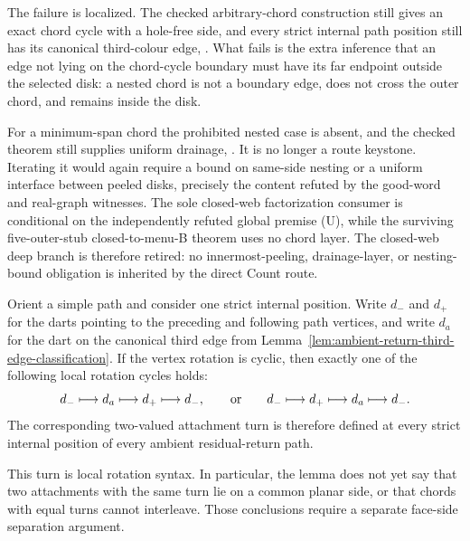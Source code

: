 The failure is localized.  The checked arbitrary-chord construction still
gives an exact chord cycle with a hole-free side,
and every strict internal path position still has its canonical third-colour
edge,
.
What fails is the extra inference that an edge not lying on the chord-cycle
boundary must have its far endpoint outside the selected disk: a nested
chord is not a boundary edge, does not cross the outer chord, and remains
inside the disk.

For a minimum-span chord the prohibited nested case is absent, and the
checked theorem still supplies uniform drainage,
.
It is no longer a route keystone.  Iterating it would again require a bound on
same-side nesting or a uniform interface between peeled disks, precisely the
content refuted by the good-word and real-graph witnesses.  The sole
closed-web factorization consumer is conditional on the independently
refuted global premise (U), while the surviving five-outer-stub
closed-to-menu-B theorem uses no chord layer.  The closed-web deep branch is
therefore retired: no innermost-peeling, drainage-layer, or nesting-bound
obligation is inherited by the direct Count route.

\begin{lemma}
\label{lem:cubic-path-attachment-rotation-side}
Orient a simple path and consider one strict internal position.  Write
$d_-$ and $d_+$ for the darts pointing to the preceding and following path
vertices, and write $d_a$ for the dart on the canonical third edge from
Lemma~\ref{lem:ambient-return-third-edge-classification}.  If the vertex
rotation is cyclic, then exactly one of the following local rotation cycles
holds:
\[
       d_-\longmapsto d_a\longmapsto d_+\longmapsto d_-,
       \qquad\hbox{or}\qquad
       d_-\longmapsto d_+\longmapsto d_a\longmapsto d_-.
\]
The corresponding two-valued attachment turn is therefore defined at every
strict internal position of every ambient residual-return path.

This turn is local rotation syntax.  In particular, the lemma does not yet
say that two attachments with the same turn lie on a common planar side, or
that chords with equal turns cannot interleave.  Those conclusions require a
separate face-side separation argument.
\end{lemma}


